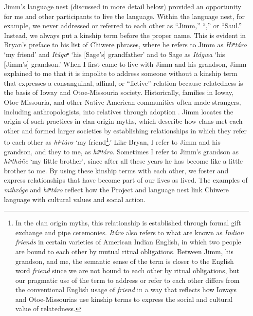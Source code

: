 \documentclass[output=paper]{LSP/langsci}
\begin{document}
Jimm's language nest (discussed in more detail below) provided an opportunity for me and other participants to live the language. Within the language nest, for example, we never addressed or referred to each other as ``Jimm,'' ``,'' or ``Saul.'' Instead, we always put a kinship term before the proper name. This is evident in Bryan's preface to his list of Chiwere phrases, where he refers to Jimm as \emph{Hiⁿtáro} `my friend' and \emph{Itúgaⁿ} `his [Sage's] grandfather' and to Sage as \emph{Itágwa} `his [Jimm's] grandson.' When I first came to live with Jimm and his grandson, Jimm explained to me that it is impolite to address someone without a kinship term that expresses a consanguinal, affinal, or ``fictive'' relation because relatedness is the basis of Ioway and Otoe-Missouria society. Historically, families in Ioway, Otoe-Missouria, and other Native American communities often made strangers, including anthropologists, into relatives through adoption \citep[see e.g.][]{Kan2001}. Jimm locates the origin of such practices in clan origin myths, which describe how clans met each other and formed larger societies by establishing relationships in which they refer to each other as \emph{hiⁿtáro} `my friend\footnote{In the clan origin myths, this relationship is established through formal gift exchange and pipe ceremonies. \emph{Itáro} also refers to what are known as \emph{Indian friends} in certain varieties of American Indian English, in which two people are bound to each other by mutual ritual obligations. Between Jimm, his grandson, and me, the semantic sense of the term is closer to the English word \emph{friend} since we are not bound to each other by ritual obligations, but our pragmatic use of the term to address or refer to each other differs from the conventional English usage of \emph{friend} in a way that reflects how Ioways and Otoe-Missourias use kinship terms to express the social and cultural value of relatedness.}.' Like Bryan, I refer to Jimm and his grandson, and they to me, as \emph{hiⁿtáro}. Sometimes I refer to Jimm's grandson as \emph{hiⁿthúñe} `my little brother', since after all these years he has become like a little brother to me. By using these kinship terms with each other, we foster and express relationships that have become part of our lives as lived. The examples of \emph{mihxóge} and \emph{hiⁿtáro} reflect how the Project and language nest link Chiwere language with cultural values and social action.
\end{document}
